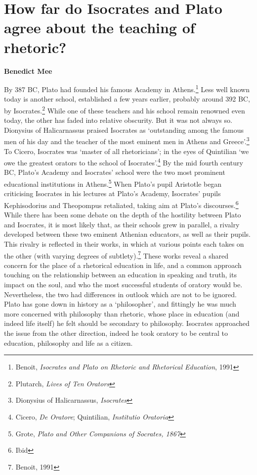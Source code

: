 \chapter{How far do Isocrates and Plato agree about the teaching of rhetoric?}

\textbf{Benedict Mee}

\begin{multicols}{2}

By 387 BC, Plato had founded his famous Academy in Athens.\footnote{\textsuperscript{}
	Benoit, \emph{Isocrates and Plato on Rhetoric and Rhetorical
		Education}, 1991} Less well known today is another school, established
a few years earlier, probably around 392 BC, by Isocrates.\footnote{\textsuperscript{}
	Plutarch, \emph{Lives of Ten Orators}} While one of these teachers and
his school remain renowned even today, the other has faded into relative
obscurity. But it was not always so. Dionysius of Halicarnassus praised
Isocrates as `outstanding among the famous men of his day and the
teacher of the most eminent men in Athens and Greece'.\footnote{\textsuperscript{}
	Dionysius of Halicarnassus, \emph{Isocrates}} To Cicero, Isocrates was
`master of all rhetoricians'; in the eyes of Quintilian `we owe the
greatest orators to the school of Isocrates'.\footnote{\textsuperscript{}
	Cicero, \emph{De Oratore}; Quintilian, \emph{Institutio Oratoria}} By
the mid fourth century BC, Plato's Academy and Isocrates' school were
the two most prominent educational institutions in Athens.\footnote{\textsuperscript{}
	Grote, \emph{Plato and Other Companions of Socrates, 1867}} When
Plato's pupil Aristotle began criticising Isocrates in his lectures at
Plato's Academy, Isocrates' pupils Kephisodorius and Theopompus
retaliated, taking aim at Plato's discourses.\footnote{\textsuperscript{}
	Ibid} While there has been some debate on the depth of the hostility
between Plato and Isocrates, it is most likely that, as their schools
grew in parallel, a rivalry developed between these two eminent Athenian
educators, as well as their pupils. This rivalry is reflected in their
works, in which at various points each takes on the other (with varying
degrees of subtlety).\footnote{\textsuperscript{} Benoit, 1991} These
works reveal a shared concern for the place of a rhetorical education in
life, and a common approach touching on the relationship between an
education in speaking and truth, its impact on the soul, and who the
most successful students of oratory would be. Nevertheless, the two had
differences in outlook which are not to be ignored. Plato has gone down
in history as a `philosopher', and fittingly he was much more concerned
with philosophy than rhetoric, whose place in education (and indeed life
itself) he felt should be secondary to philosophy. Isocrates approached
the issue from the other direction, indeed he took oratory to be central
to education, philosophy and life as a citizen.


\end{multicols}

